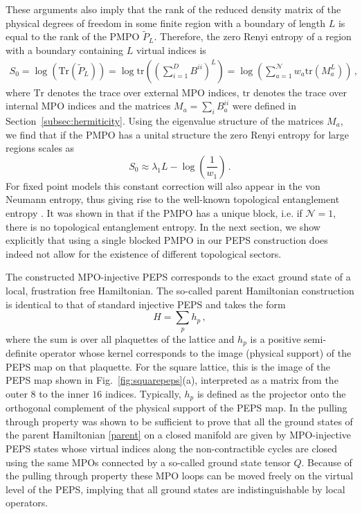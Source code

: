 \documentclass[12 pt]{article}
\begin{document}
These arguments also imply that the rank of the reduced density matrix of the physical degrees of freedom in some finite region with a boundary of length $L$ is equal to the rank of the PMPO $\tilde{P}_L$. Therefore, the zero Renyi entropy of a region with a boundary containing $L$ virtual indices is
\begin{equation}
\begin{split}
S_0 = \log(\text{Tr}(\tilde{P}_L)) = \log\text{tr}\left(\left(\sum_{i = 1}^D B^{ii}\right)^L\right) = \log\left(\sum_{a=1}^{\mathcal{N}}w_a\text{tr}\left( M_a^L\right)\right)\, ,
\end{split}
\end{equation}
where $\text{Tr}$ denotes the trace over external MPO indices, $\text{tr}$ denotes the trace over internal MPO indices and the matrices $M_a=\sum_{i} B_a^{ii}$ were defined in Section~\ref{subsec:hermiticity}. Using the eigenvalue structure of the matrices $M_a$, we find that if the PMPO has a unital structure the zero Renyi entropy for large regions scales as
\begin{equation}
S_0 \approx \lambda_1 L - \log\left(\frac{1}{w_1}\right)\, .
\end{equation}
For fixed point models this constant correction will also appear in the von Neumann entropy, thus giving rise to the well-known topological entanglement entropy \cite{KitaevPreskill}. It was shown in \cite{SPTpaper} that if the PMPO has a unique block, i.e. if $\mathcal{N} = 1$, there is no topological entanglement entropy. In the next section, we show explicitly that using a single blocked PMPO in our PEPS construction does indeed not allow for the existence of different topological sectors.

The constructed MPO-injective PEPS corresponds to the exact ground state of a local,  frustration free Hamiltonian. The so-called parent Hamiltonian construction is identical to that of standard injective PEPS \cite{GarciaVerstraeteWolfCirac08} and takes the form
\begin{equation}\label{parent}
H = \sum_{p} h_p\, ,
\end{equation}
where the sum is over all plaquettes of the lattice and $h_p$ is a positive semi-definite operator whose kernel corresponds to the image (physical support) of the PEPS map on that plaquette. For the square lattice, this is the image of the PEPS map shown in Fig.~\ref{fig:squarepeps}(a), interpreted as a matrix from the outer $8$ to the inner $16$ indices. Typically, $h_p$ is defined as the projector onto the orthogonal complement of the physical support of the PEPS map. In \cite{MPOpaper} the pulling through property was shown to be sufficient to prove that all the ground states of the parent Hamiltonian \eqref{parent} on a closed manifold are given by MPO-injective PEPS states whose virtual indices along the non-contractible cycles are closed using the same MPOs connected by a so-called ground state tensor $Q$. Because of the pulling through property these MPO loops can be moved freely on the virtual level of the PEPS, implying that all ground states are indistinguishable by local operators.
\end{document}

